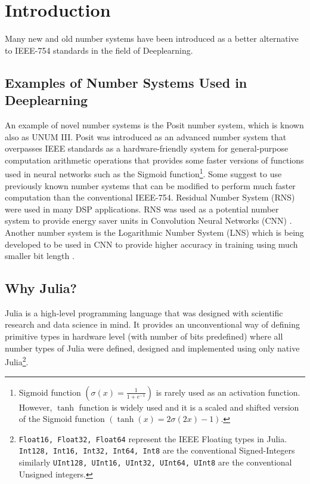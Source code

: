\section{Introduction}

Many new and old number systems have been introduced as a better alternative to IEEE-754 standards\cite{754} in the field of Deeplearning.

\subsection{Examples of Number Systems Used in Deeplearning}

An example of novel number systems is the Posit number system\cite{Gustafson2017}, which is known also as UNUM III. Posit was introduced as an advanced number system that overpasses IEEE standards as a hardware-friendly system for general-purpose computation arithmetic operations that provides some faster versions of functions used in neural networks such as the Sigmoid function\footnote{Sigmoid function $\left(\sigma(x) = \frac{1}{1 + e^{-1}}\right)$ is rarely used as an activation function. However, $\tanh$ function is widely used and it is a scaled and shifted version of the Sigmoid function $\left(\tanh(x) = 2 \sigma(2x) -1\right)$.}. Some suggest to use previously known number systems that can be modified to perform much faster computation than the conventional IEEE-754. Residual Number System (RNS) \cite{Garner1959} were used in many DSP applications. RNS was used as a potential number system to provide energy saver units in Convolution Neural Networks (CNN) \cite{Miyashita2016}. Another number system is the Logarithmic Number System (LNS) \cite{Kingsbury1971,Alexopoulos1975,Lee1977} which is being developed to be used in CNN to provide higher accuracy in training using much smaller bit length \cite{Miyashita2016}.

\subsection{Why Julia?}

Julia \cite{Julia,Bezanson2017} is a high-level programming language that was designed with scientific research and data science in mind. It provides an unconventional way of defining primitive types in hardware level (with number of bits predefined) where all number types of Julia were defined, designed and implemented using only native Julia\footnote{\texttt{Float16, Float32, Float64} represent the IEEE Floating types in Julia. \texttt{Int128, Int16, Int32, Int64, Int8} are the conventional Signed-Integers similarly \texttt{UInt128, UInt16, UInt32, UInt64, UInt8} are the conventional Unsigned integers.}.

